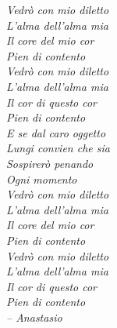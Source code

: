  \begin{dedication} %
\raggedleft\textit{
Vedrò con mio diletto~~~~~~~~~~~~~~~~~~~~\\ 
L'alma dell'alma mia~~~~~~~~~~~~~~~~~~~~\\ %
Il core del mio cor~~~~~~~~~~~~~~~~~~~~\\
Pien di contento~~~~~~~~~~~~~~~~~~~~\\ %
Vedrò con mio diletto~~~~~~~~~~~~~~~~~~~~\\
L'alma dell'alma mia~~~~~~~~~~~~~~~~~~~~\\ %
Il cor di questo cor~~~~~~~~~~~~~~~~~~~~\\
Pien di contento~~~~~~~~~~~~~~~~~~~~\\ %
E se dal caro oggetto~~~~~~~~~~~~~~~~~~~~\\
Lungi convien che sia~~~~~~~~~~~~~~~~~~~~\\ %
Sospirerò penando~~~~~~~~~~~~~~~~~~~~\\
Ogni momento~~~~~~~~~~~~~~~~~~~~\\
Vedrò con mio diletto~~~~~~~~~~~~~~~~~~~~\\
L'alma dell'alma mia~~~~~~~~~~~~~~~~~~~~\\ %
Il core del mio cor~~~~~~~~~~~~~~~~~~~~\\
Pien di contento~~~~~~~~~~~~~~~~~~~~\\ %
Vedrò con mio diletto~~~~~~~~~~~~~~~~~~~~\\
L'alma dell'alma mia~~~~~~~~~~~~~~~~~~~~\\ %
Il cor di questo cor~~~~~~~~~~~~~~~~~~~~ \\
Pien di contento~~~~~~~~~~~~~~~~~~~~ \\ %
-- Anastasio~~~~~~~~~~~~~~~~~~~~ \\
}
\end{dedication}

